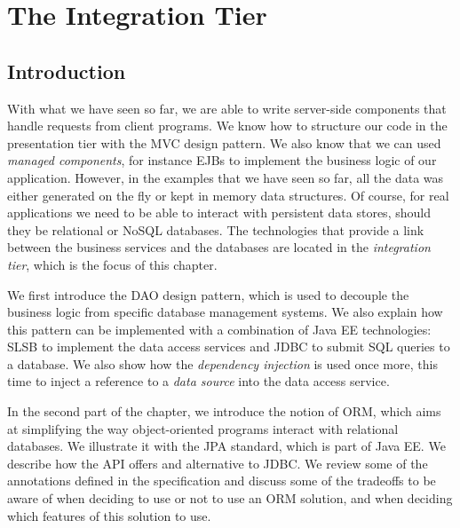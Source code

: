 \chapter{The Integration Tier}
\label{ch:integration-tier}

\section{Introduction}

With what we have seen so far, we are able to write server-side components that handle requests from client programs. We know how to structure our code in the presentation tier with the \ac{MVC} design pattern. We also know that we can used \emph{managed components}, for instance \ac{EJB}s to implement the business logic of our application. However, in the examples that we have seen so far, all the data was either generated on the fly or kept in memory data structures. Of course, for real applications we need to be able to interact with persistent data stores, should they be relational or NoSQL databases. The technologies that provide a link between the business services and the databases are located in the \emph{integration tier}, which is the focus of this chapter.


We first introduce the \ac{DAO} design pattern, which is used to decouple the business logic from specific database management systems. We also explain how this pattern can be implemented with a combination of Java EE technologies: \ac{SLSB} to implement the data access services and \ac{JDBC} to submit SQL queries to a database. We also show how the \emph{dependency injection} is used once more, this time to inject a reference to a \emph{data source} into the data access service. 


In the second part of the chapter, we introduce the notion of \ac{ORM}, which aims at simplifying the way object-oriented programs interact with relational databases. We illustrate it with the \ac{JPA} standard, which is part of Java EE. We describe how the API offers and alternative to JDBC. We review some of the annotations defined in the specification and discuss some of the tradeoffs to be aware of when deciding to use or not to use an \ac{ORM} solution, and when deciding which features of this solution to use.

